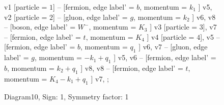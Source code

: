 \documentclass{revtex4}
\begin{document}
\begin{figure}[!htb]
\begin{center}
{    %
v1 [particle = \(1\)] -- [fermion, edge label' = \(b\), momentum = \(k_{1}\) ] v5, 
v2 [particle = \(2\)] -- [gluon, edge label' = \(g\), momentum = \(k_{2}\) ] v6, 
v8 -- [boson, edge label' = \(W^{-}\), momentum = \(K_{3}\) ] v3 [particle = \(3\)], 
v7 -- [fermion, edge label' = \(t\), momentum = \(K_{4}\) ] v4 [particle = \(4\)], 
v5 -- [fermion, edge label' = \(b\), momentum = \(q_{1}\) ] v6, 
v7 -- [gluon, edge label' = \(g\), momentum = \(-k_{1} + q_{1}\) ] v5, 
v6 -- [fermion, edge label' = \(b\), momentum = \(k_{2} + q_{1}\) ] v8, 
v8 -- [fermion, edge label' = \(t\), momentum = \(K_{4} - k_{1} + q_{1}\) ] v7, 
};
\end{center}
\caption{Diagram10, Sign: 1, Symmetry factor: 1}
\end{figure}
\newpage
\end{document}
